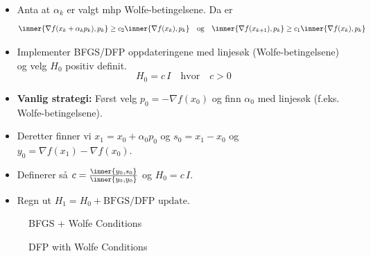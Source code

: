 \begin{itemize}
	\item Anta at \(\alpha_k\) er valgt mhp Wolfe-betingelsene. Da er
	      \[
		      \inner{\nabla f(x_k + \alpha_k p_k), p_k} \geq c_2 \inner{\nabla f(x_k), p_k} \quad \text{og} \quad \inner{\nabla f(x_{k+1}), p_k} \geq c_1 \inner{\nabla f(x_k), p_k}
	      \]
	\item Implementer BFGS/DFP oppdateringene med linjesøk (Wolfe-betingelsene) og velg \( H_0 \) positiv definit.
	      \[
		      H_0 = c \, I \quad \text{hvor} \quad c > 0
	      \]


	\item \textbf{Vanlig strategi:} Først velg \( p_0 = -\nabla f(x_0) \) og finn \( \alpha_0 \) med linjesøk (f.eks. Wolfe-betingelsene).
	\item Deretter finner vi \(x_1 = x_0 + \alpha_0 p_0 \) og \( s_0 = x_1 - x_0 \) og \( y_0 = \nabla f(x_1) - \nabla f(x_0) \).
	\item Definerer så \( c = \frac{\inner{y_0, s_0}}{\inner{y_0, y_0}} \) og \( H_0 = c \, I \).
	\item Regn ut \( H_1 = H_0 + \text{BFGS/DFP update} \).
\end{itemize}

\begin{figure}[H]
	\begin{minipage}[t]{0.49\textwidth}
		\begin{algorithm}[H]
			\caption{BFGS + Wolfe Conditions}
			\label{alg:bfgs}
			\;
		\end{algorithm}
	\end{minipage}
	\hfill
	\begin{minipage}[t]{0.49\textwidth}
		\begin{algorithm}[H]
			\caption{DFP with Wolfe Conditions}
			\label{alg:dfp}
			\;
		\end{algorithm}
	\end{minipage}
\end{figure}

